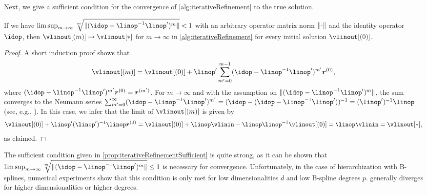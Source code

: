 Next, we give a sufficient condition for the
convergence of \cref{alg:iterativeRefinement} to the true solution.

\begin{proposition}
  \label{prop:iterativeRefinementSufficient}
  If we have $\limsup_{m \to \infty}
  \sqrt[m]{\norm{(\idop - \linop^{-1} \linop')^m}} < 1$
  with an arbitrary operator matrix norm $\norm{\cdot}$ and the
  identity operator $\idop$,
  then $\vlinout[(m)] \to \vlinout[\ast]$ for $m \to \infty$
  in \cref{alg:iterativeRefinement}
  for every initial solution $\vlinout[(0)]$.
\end{proposition}

\begin{proof}
  A short induction proof shows that
  \begin{equation}
    \label{eq:proofPropIterativeRefinementSufficient}
    \vlinout[(m)]
    = \vlinout[(0)] + \linop'
    \sum_{m'=0}^{m-1} (\idop - \linop^{-1} \linop')^{m'} \*r^{(0)},
  \end{equation}
  where $(\idop - \linop^{-1} \linop')^{m'} \*r^{(0)} = \*r^{(m')}$.
  For $m \to \infty$ and with the assumption on
  $\norm{(\idop - \linop^{-1} \linop')^m}$,
  the sum converges to the Neumann series
  $\sum_{m'=0}^\infty (\idop - \linop^{-1} \linop')^{m'}
  = (\idop - (\idop - \linop^{-1} \linop'))^{-1} = (\linop')^{-1} \linop$
  (see, e.g., \cite{Werner11Funktionalanalysis}).
  In this case, we infer that the limit of $\vlinout[(m)]$ is given by
  \begin{equation}
    \vlinout[(0)] + \linop' (\linop')^{-1} \linop \*r^{(0)}
    = \vlinout[(0)] + \linop \vlinin - \linop \linop^{-1} \vlinout[(0)]
    = \linop \vlinin
    = \vlinout[\ast],
  \end{equation}
  as claimed.
\end{proof}

The sufficient condition given in \cref{prop:iterativeRefinementSufficient}
is quite strong, as it can be shown that $\limsup_{m \to \infty}
\sqrt[m]{\norm{(\idop - \linop^{-1} \linop')^m}} \le 1$ is necessary for
convergence.
Unfortunately, in the case of hierarchization with B-splines,
numerical experiments show that
this condition is only met for low dimensionalities $d$ and low
B-spline degrees $p$.
 generally diverges
for higher dimensionalities or higher degrees.



